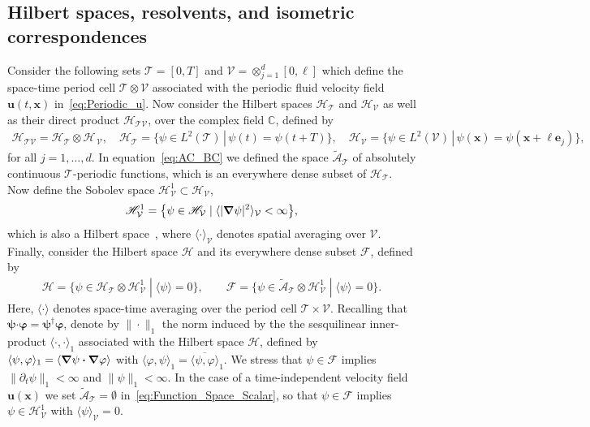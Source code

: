 \documentclass[leqno,onefignum,onetabnum]{siamltex1213}
\newcommand{\Tc}{\mathcal{T}}
\newcommand{\Vc}{\mathcal{V}}
\newcommand{\Hs}{\mathscr{H}}
\newcommand{\As}{\mathscr{A}}
\newcommand{\Fs}{\mathscr{F}}
\newcommand\bnabla{\mbox{\boldmath${\nabla}$}}
\providecommand\bcdot{\boldsymbol{\cdot}}
\newcommand{\vecx}{\boldsymbol{x}}
\newcommand{\vecu}{\boldsymbol{u}}
\newcommand{\vece}{\boldsymbol{e}}
\newcommand{\vecpsi}{\boldsymbol{\psi}}
\newcommand{\vecvarphi}{\boldsymbol{\varphi}}
\begin{document}
\subsection{Hilbert spaces, resolvents, and isometric
  correspondences} \label{sec:Hilbert_Isometric_Corr} 
%
Consider the following sets $\Tc=[0,T]$ and $\Vc=\otimes_{j=1}^d[0,\ell]$ which
define the space-time period cell $\Tc\otimes\Vc$ associated with the
periodic fluid velocity field $\vecu(t,\vecx)$
in~\eqref{eq:Periodic_u}. Now consider the Hilbert spaces $\Hs_{\Tc}$
and $\Hs_{\Vc}$ as well as their direct product
$\Hs_{\Tc\Vc}$, over the complex field $\mathbb{C}$, defined by
%
\begin{align}\label{eq:Hilbert_Spaces_scalar}
  \Hs_{\Tc\Vc}=\Hs_{\Tc}\otimes\Hs_{\,\Vc}, \quad
  \Hs_{\Tc}=\big\{\psi\in L^2(\Tc) \, | \, \psi(t)=\psi(t+T)\big\}, \quad
  \Hs_{\Vc}=\big\{\psi\in L^2(\Vc) \, | \, \psi(\vecx)=\psi(\vecx+\ell\vece_j)\big\},  
\end{align}
%
for all $j=1,\ldots,d$. In equation~\eqref{eq:AC_BC} we defined the space
$\tilde{\As}_{\Tc}$ of absolutely continuous $\Tc$-periodic functions,
which is an everywhere dense subset of $\Hs_{\Tc}$. Now define the
Sobolev space $\Hs^1_{\Vc}\subset\Hs_{\Vc}$,         
% 
\begin{align}\label{eq:Sobolev}
  \Hs^1_{\Vc}=\big\{\psi\in \Hs_{\Vc} \; | \; \langle|\bnabla \psi|^2\rangle_{\Vc}<\infty\big\}, 
\end{align}
%
which is also a Hilbert space~\cite{Folland:95:PDEs}, where $\langle\cdot\rangle_{\Vc}$ 
denotes spatial averaging over $\Vc$.  Finally, consider the Hilbert
space $\Hs$ and its everywhere dense subset $\Fs$, defined by
%
\begin{align}\label{eq:Function_Space_Scalar}
  \Hs=\big\{\psi\in\Hs_{\Tc}\otimes\Hs^1_{\Vc} \; | \; \langle \psi\rangle=0\big\}, \qquad
  \Fs=\big\{\psi\in\tilde{\As}_{\Tc}\otimes\Hs^1_{\Vc} \; | \; \langle \psi\rangle=0\big\}.
\end{align}
%
Here, $\langle\cdot\rangle$ denotes space-time averaging over the period cell
$\Tc\times\Vc$. Recalling that $\vecpsi\bcdot\vecvarphi=\vecpsi^\dagger\vecvarphi$,
denote by $\|\cdot\|_1$ the norm induced by the the sesquilinear  
inner-product $\langle\cdot,\cdot\rangle_1$ associated with the Hilbert space $\Hs$, defined by
$\langle\psi,\varphi\rangle_1=\left\langle\bnabla \psi\bcdot\bnabla \varphi \right\rangle$ with
$\langle\varphi,\psi\rangle_1=\overline{\langle\psi,\varphi\rangle}_1$.  
We stress that $\psi\in\Fs$ implies $\|\partial_t\psi\|_1<\infty$ and $\|\psi\|_1<\infty$. In the 
case of a time-independent velocity field $\vecu(\vecx)$ we set
$\tilde{\As}_{\Tc}=\emptyset$ in~\eqref{eq:Function_Space_Scalar}, so that
$\psi\in\Fs$ implies $\psi\in\Hs^1_{\Vc}$ with $\langle\psi\rangle_{\Vc}=0$.
\end{document}
